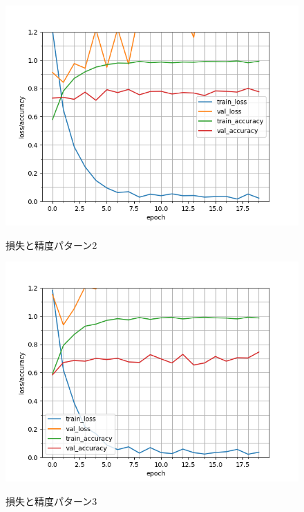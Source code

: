 \begin{figure}
	\begin{center}
		\includegraphics[scale=0.8]{./images/classify-model/loss_acuuracy_CNN_mel_2.png}
		\caption{損失と精度パターン2}
		\label{fig:CNNmel2}
		\includegraphics[scale=0.8]{./images/classify-model/loss_acuuracy_CNN_mel_3.png}
		\caption{損失と精度パターン3}
		\label{fig:CNNmel3}
	\end{center}
\end{figure}
